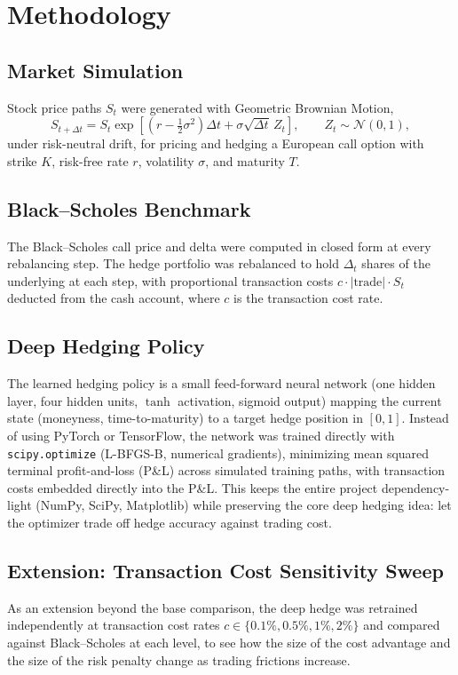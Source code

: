 \documentclass[11pt]{article}
\begin{document}
\section{Methodology}

\subsection{Market Simulation}
Stock price paths $S_t$ were generated with Geometric Brownian Motion,
\[
S_{t+\Delta t} = S_t \exp\left[\left(r - \tfrac{1}{2}\sigma^2\right)\Delta t
+ \sigma \sqrt{\Delta t}\, Z_t\right], \qquad Z_t \sim \mathcal{N}(0,1),
\]
under risk-neutral drift, for pricing and hedging a European call option
with strike $K$, risk-free rate $r$, volatility $\sigma$, and maturity
$T$.

\subsection{Black--Scholes Benchmark}
The Black--Scholes call price and delta were computed in closed form at
every rebalancing step. The hedge portfolio was rebalanced to hold
$\Delta_t$ shares of the underlying at each step, with proportional
transaction costs $c \cdot |\text{trade}| \cdot S_t$ deducted from the
cash account, where $c$ is the transaction cost rate.

\subsection{Deep Hedging Policy}
The learned hedging policy is a small feed-forward neural network (one
hidden layer, four hidden units, $\tanh$ activation, sigmoid output)
mapping the current state (moneyness, time-to-maturity) to a target
hedge position in $[0,1]$. Instead of using PyTorch or TensorFlow, the
network was trained directly with \texttt{scipy.optimize} (L-BFGS-B,
numerical gradients), minimizing mean squared terminal profit-and-loss
(P\&L) across simulated training paths, with transaction costs embedded
directly into the P\&L. This keeps the entire project dependency-light
(NumPy, SciPy, Matplotlib) while preserving the core deep hedging idea:
let the optimizer trade off hedge accuracy against trading cost.

\subsection{Extension: Transaction Cost Sensitivity Sweep}
As an extension beyond the base comparison, the deep hedge was retrained
independently at transaction cost rates $c \in \{0.1\%, 0.5\%, 1\%,
2\%\}$ and compared against Black--Scholes at each level, to see how the
size of the cost advantage and the size of the risk penalty change as
trading frictions increase.
\end{document}
